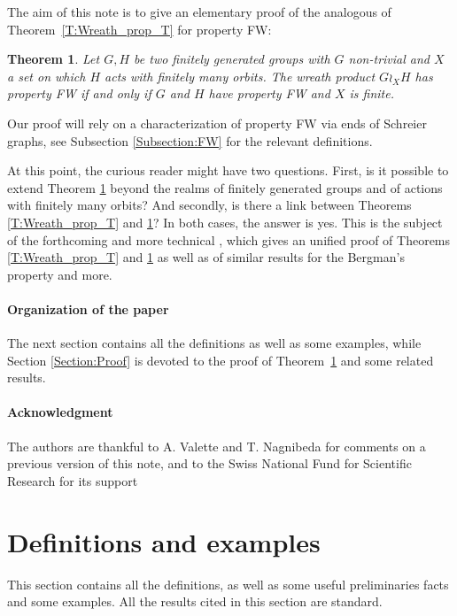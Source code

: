 \documentclass[a4paper]{article}
\newtheorem{thm}[lem]{Theorem}
\theoremstyle{definition}
\theoremstyle{remark}%
\begin{document}
The aim of this note is to give an elementary proof of the analogous of Theorem~\ref{T:Wreath_prop_T} for property FW:
%
%
\begin{thm}\label{Thm:Main}
Let $G,H$ be two finitely generated groups with $G$ non-trivial and $X$ a set on which $H$ acts with finitely many orbits. The wreath product $G \wr_X H$ has property FW if and only if $G$ and $H$ have property FW and $X$ is finite.
\end{thm}
%
%
Our proof will rely on a characterization of property FW via ends of Schreier graphs, see Subsection \ref{Subsection:FW} for the relevant definitions.

At this point, the curious reader might have two questions. First, is it possible to extend Theorem \ref{Thm:Main} beyond the realms of finitely generated groups and of actions with finitely many orbits? And secondly, is there a link between Theorems \ref{T:Wreath_prop_T} and \ref{Thm:Main}?
In both cases, the answer is yes.
This is the subject of the forthcoming and more technical \cite{LS2021}, which gives an unified proof of Theorems \ref{T:Wreath_prop_T} and \ref{Thm:Main} as well as of similar results for the Bergman's property and more.
%
%
%
%
\paragraph{Organization of the paper}
The next section contains all the definitions as well as some examples, while Section \ref{Section:Proof} is devoted to the proof of Theorem~\ref{Thm:Main} and some related results.
%
%
%
%
\paragraph{Acknowledgment}
The authors are thankful to A. Valette and T. Nagnibeda for comments on a previous version of this note, and to the Swiss National Fund for Scientific Research for its support
%
%
%
%
%
%
%
%
%
%
\section{Definitions and examples}
This section contains all the definitions, as well as some useful preliminaries facts and some examples.
All the results cited in this section are standard.
%
%
%
%
%
%
%
%
%
%
\end{document}
